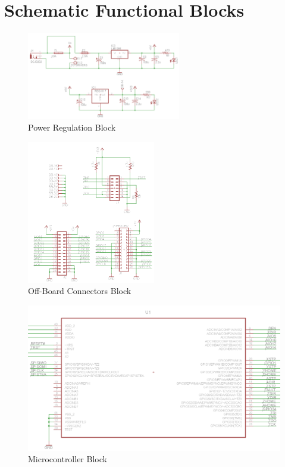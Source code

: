 \chapter{Schematic Functional Blocks}
\label{chap:schematic-breakdown}

\begin{figure}[h]
\centering
\includegraphics[width=0.6\textwidth]{reliability-analysis/functional-breakdown-power.png}
\caption{Power Regulation Block}
\label{fig:power-block}
\end{figure}


\begin{figure}[h]
\centering
\includegraphics[width=0.5\textwidth]{reliability-analysis/functional-breakdown-connectors.png}
\caption{Off-Board Connectors Block}
\label{fig:connectors-block}
\end{figure}

\begin{figure}[h]
\centering
\includegraphics[width=\textwidth]{reliability-analysis/functional-breakdown-uc.png}
\caption{Microcontroller Block}
\label{fig:uc-block}
\end{figure}

